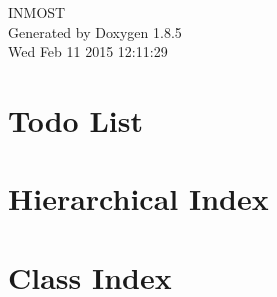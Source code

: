\documentclass[twoside]{book}
\newcommand{\clearemptydoublepage}{%
  \newpage{\pagestyle{empty}\cleardoublepage}%
}
\begin{document}
\hypersetup{pageanchor=false}
\begin{titlepage}
\vspace*{7cm}
\begin{center}%
{\Large I\-N\-M\-O\-S\-T }\\
\vspace*{1cm}
{\large Generated by Doxygen 1.8.5}\\
\vspace*{0.5cm}
{\small Wed Feb 11 2015 12:11:29}\\
\end{center}
\end{titlepage}
\clearemptydoublepage
\tableofcontents
\clearemptydoublepage
{}
\hypersetup{pageanchor=true}

\chapter{Todo List}
\label{todo}
\hypertarget{todo}{}

\chapter{Hierarchical Index}

\chapter{Class Index}

\end{document}
